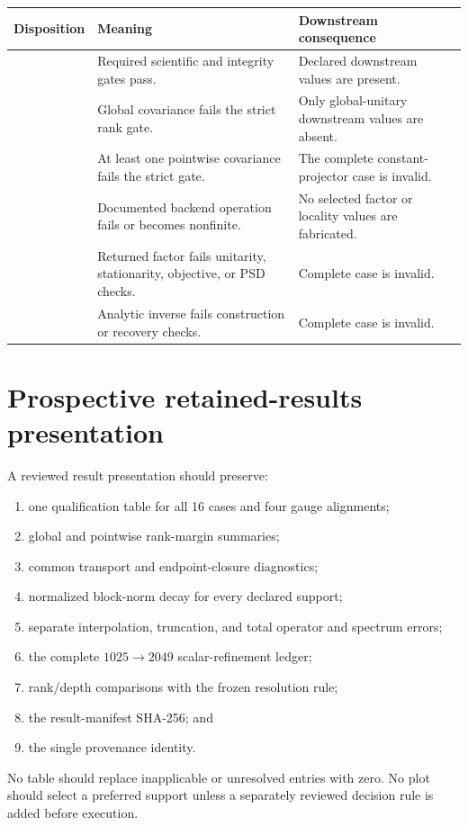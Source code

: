 \documentclass[11pt]{article}
\begin{document}
\begin{center}\small
\begin{tabularx}{\textwidth}{>{\raggedright\arraybackslash}p{}YY}
\toprule
\textbf{Disposition} & \textbf{Meaning} & \textbf{Downstream consequence} \\
\midrule
{} & Required scientific and integrity gates pass. & Declared downstream values are present. \\
 & Global covariance fails the strict rank gate. & Only global-unitary downstream values are absent. \\
 & At least one pointwise covariance fails the strict gate. & The complete constant-projector case is invalid. \\
 & Documented backend operation fails or becomes nonfinite. & No selected factor or locality values are fabricated. \\
 & Returned factor fails unitarity, stationarity, objective, or PSD checks. & Complete case is invalid. \\
 & Analytic inverse fails construction or recovery checks. & Complete case is invalid. \\
\bottomrule
\end{tabularx}
\end{center}

\section{Prospective retained-results presentation}
\label{app:future-results}

A reviewed result presentation should preserve:
\begin{enumerate}
\item one qualification table for all 16 cases and four gauge alignments;
\item global and pointwise rank-margin summaries;
\item common transport and endpoint-closure diagnostics;
\item normalized block-norm decay for every declared support;
\item separate interpolation, truncation, and total operator and spectrum errors;
\item the complete $1025\rightarrow2049$ scalar-refinement ledger;
\item rank/depth comparisons with the frozen resolution rule;
\item the result-manifest SHA-256; and
\item the single  provenance identity.
\end{enumerate}
No table should replace inapplicable or unresolved entries with zero. No plot should
select a preferred support unless a separately reviewed decision rule is added before
execution.



\end{document}
